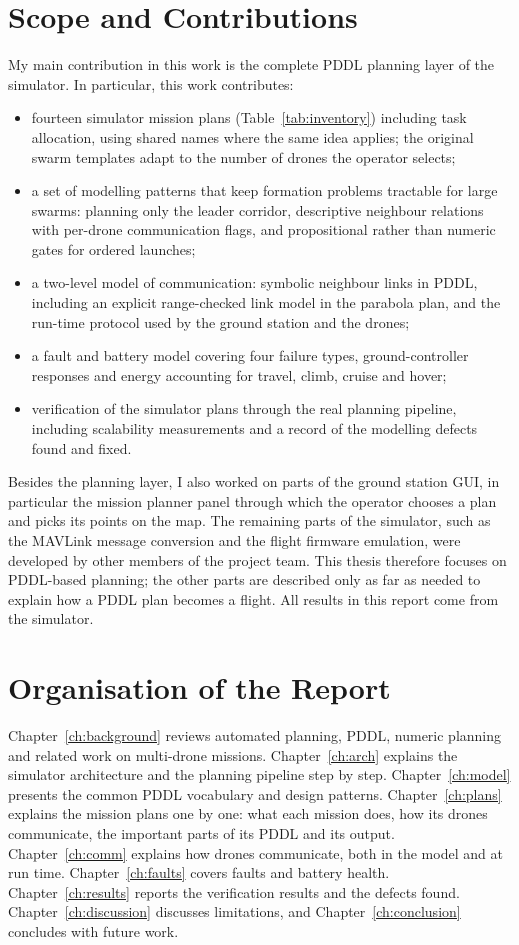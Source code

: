 \documentclass[11pt,a4paper,oneside]{report}
\begin{document}
\section{Scope and Contributions}
My main contribution in this work is the complete PDDL planning layer of the simulator. In
particular, this work contributes:
\begin{itemize}
  \item fourteen simulator mission plans (Table~\ref{tab:inventory}) including task allocation, using shared names where the same idea applies; the original
        swarm templates adapt
        to the number of drones the operator selects;
  \item a set of modelling patterns that keep formation problems tractable for large swarms:
        planning only the leader corridor, descriptive neighbour relations with per-drone
        communication flags, and propositional rather than numeric gates for ordered launches;
  \item a two-level model of communication: symbolic neighbour links in PDDL, including an
        explicit range-checked link model in the parabola plan, and the run-time protocol used
        by the ground station and the drones;
  \item a fault and battery model covering four failure types, ground-controller responses and
        energy accounting for travel, climb, cruise and hover;
  \item verification of the simulator plans through the real planning pipeline, including scalability
        measurements and a record of the modelling defects found and fixed.
\end{itemize}

Besides the planning layer, I also worked on parts of the ground station GUI, in particular the
mission planner panel through which the operator chooses a plan and picks its points on the map.
The remaining parts of the simulator, such as the MAVLink message conversion and the flight
firmware emulation, were developed by other members of the project team. This thesis therefore
focuses on PDDL-based planning; the other parts are described only as far as needed to explain
how a PDDL plan becomes a flight. All results in this report come from the simulator.

\section{Organisation of the Report}
Chapter~\ref{ch:background} reviews automated planning, PDDL, numeric planning and related work
on multi-drone missions. Chapter~\ref{ch:arch} explains the simulator architecture and the
planning pipeline step by step. Chapter~\ref{ch:model} presents the common PDDL vocabulary and
design patterns. Chapter~\ref{ch:plans} explains the mission plans one by one: what each
mission does, how its drones communicate, the important parts of its PDDL and its output.
Chapter~\ref{ch:comm} explains how drones communicate, both in the model and at run time.
Chapter~\ref{ch:faults} covers faults and battery health. Chapter~\ref{ch:results} reports the
verification results and the defects found. Chapter~\ref{ch:discussion} discusses limitations,
and Chapter~\ref{ch:conclusion} concludes with future work.
\end{document}
